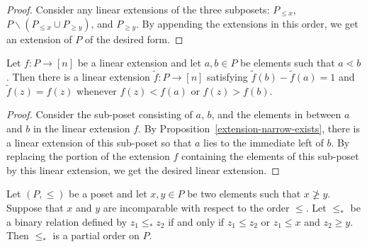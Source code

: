 \documentclass{puthesis-UG}
\begin{document}
\begin{proof}
    Consider any linear extensions of the three subposets: $P_{\leq x}$, $P \backslash (P_{\leq x} \cup P_{\geq y})$, and $P_{\geq y}$. By appending the extensions in this order, we get an extension of $P$ of the desired form. 
\end{proof}

\begin{prop} \label{covering-modification}
    Let $f : P \to [n]$ be a linear extension and let $a, b \in P$ be elements such that $a \lessdot b$. Then there is a linear extension $\tilde{f} : P \to [n]$ satisfying $\tilde{f}(b) - \tilde{f}(a) = 1$ and $\tilde{f}(z) = f(z)$ whenever $f(z) < f(a)$ or $f(z) > f(b)$. 
\end{prop}

\begin{proof}
    Consider the sub-poset consisting of $a$, $b$, and the elements in between $a$ and $b$ in the linear extension $f$. By Proposition~\ref{extension-narrow-exists}, there is a linear extension of this sub-poset so that $a$ lies to the immediate left of $b$. By replacing the portion of the extension $f$ containing the elements of this sub-poset by this linear extension, we get the desired linear extension. 
\end{proof}

\begin{lem} \label{add-new-relation}
    Let $(P, \leq)$ be a poset and let $x, y \in P$ be two elements such that $x \not \geq y$. Suppose that $x$ and $y$ are incomparable with respect to the order $\leq$. Let $\leq_*$ be a binary relation defined by $z_1 \leq_* z_2$ if and only if $z_1 \leq z_2$ or $z_1 \leq x$ and $z_2 \geq y$. Then $\leq_*$ is a partial order on $P$. 
\end{lem}
\end{document}

